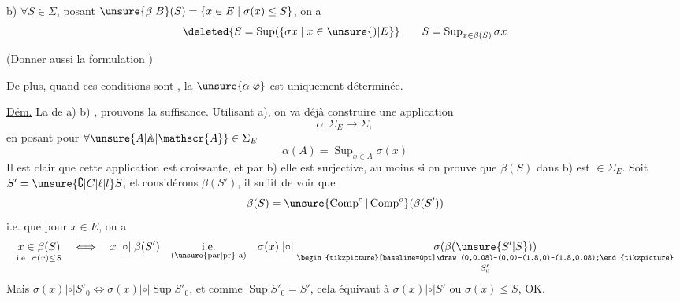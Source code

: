 
b) $\forall S\in\Sigma$, posant $\unsure{\beta|B}(S)=\{x\in E\mid\sigma(x)\leq S\}$, on a
\[
\deleted{S=\operatorname{Sup}(\{\sigma x\mid x\in\unsure{)|E}}
\qquad S=\operatorname{Sup}_{x\in\beta(S)}\sigma x
\]

(Donner aussi la formulation )

De plus, quand ces conditions sont , la  $\unsure{\alpha|\varphi}$ est uniquement déterminée.

\uline{Dém.} La  de a) b) , prouvons la suffisance. Utilisant a), on va déjà construire une application
\[
\alpha:\Sigma_E\longrightarrow\Sigma,
\]
en posant pour $\forall\unsure{A|\mathbb{A}|\mathscr{A}}\in\Sigma_E$
\[
\alpha(A)=\operatorname{Sup}_{x\in A}\sigma(x)
\]
Il est clair que cette application est croissante, et par b) elle est surjective,  au moins si on prouve que $\beta(S)$ dans b) est $\in\Sigma_E$. Soit $S'=\unsure{\complement|C|\ell|l}S$, et considérons $\beta(S')$, il suffit de voir que
\[
\beta(S)=\unsure{\operatorname{Comp}^{\circ}|\operatorname{Comp}^{o}}(\beta(S'))
\]
i.e. que pour $x\in E$, on a
\[
\underset{\text{i.e. }\sigma(x)\leq S}{x\in\beta(S)}
\quad\Longleftrightarrow\quad
x\mathrel{|{\circ}|}\beta(S')
\quad\underset{\text{(\unsure{par|pr} a)}}{\text{i.e.}}\quad
\sigma(x)\mathrel{|{\circ}|}\underset{S'_0}{\underset{\begin{tikzpicture}[baseline=0pt]\draw (0,0.08)--(0,0)--(1.8,0)--(1.8,0.08);\end{tikzpicture}}{\sigma(\beta(\unsure{S'|S}))}}
\]
Mais $\sigma(x)\mathrel{|{\circ}|}S'_0\Longleftrightarrow\sigma(x)\mathrel{|{\circ}|}\operatorname{Sup}S'_0$, et comme $\operatorname{Sup}S'_0=S'$, cela équivaut à $\sigma(x)\mathrel{|{\circ}|}S'$ ou $\sigma(x)\leq S$, OK.


